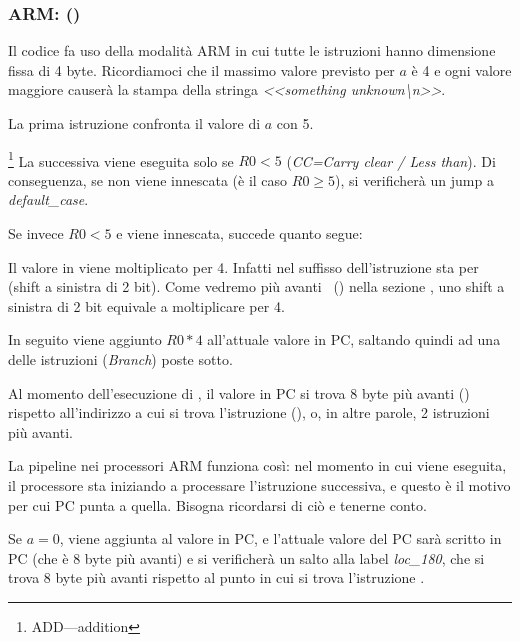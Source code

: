 \subsubsection{ARM: \OptimizingKeilVI (\ARMMode)}
\label{sec:SwitchARMLot}



Il codice fa uso della modalità ARM in cui tutte le istruzioni hanno dimensione fissa di 4 byte.
Ricordiamoci che il massimo valore previsto per $a$ è 4 e ogni valore maggiore causerà la stampa della stringa 
\emph{<<something unknown\textbackslash{}n>>}.

La prima istruzione  confronta il valore di $a$ con 5.

\footnote{ADD---addition}
La successiva  viene eseguita solo se $R0 < 5$ (\emph{CC=Carry clear / Less than}). 
Di conseguenza, se  non viene innescata (è il caso $R0 \geq 5$), si verificherà un jump a \emph{default\_case}.

Se invece $R0 < 5$ e  viene innescata, succede quanto segue:

Il valore in  viene moltiplicato per 4.
Infatti  nel suffisso dell'istruzione sta per  (shift a sinistra di 2 bit).
Come vedremo più avanti ~() nella sezione \q{\ShiftsSectionName}, uno shift a sinistra
di 2 bit equivale a moltiplicare per 4.

In seguito viene aggiunto $R0*4$ all'attuale valore in \ac{PC}, saltando quindi ad una delle istruzioni  (\emph{Branch}) poste sotto.

Al momento dell'esecuzione di , il valore in \ac{PC} si trova 8 byte più avanti ()
rispetto all'indirizzo a cui si trova l'istruzione  (), 
o, in altre parole, 2 istruzioni più avanti.


La pipeline nei processori ARM funziona così: nel momento in cui  viene eseguita,
il processore sta iniziando a processare l'istruzione successiva, e questo è il motivo per cui \ac{PC} punta a quella.
Bisogna ricordarsi di ciò e tenerne conto.

Se $a=0$, viene aggiunta al valore in \ac{PC},
e l'attuale valore del \ac{PC} sarà scritto in \ac{PC} (che è 8 byte più avanti)
e si verificherà un salto alla label \emph{loc\_180},
che si trova 8 byte più avanti rispetto al punto in cui si trova l'istruzione .

